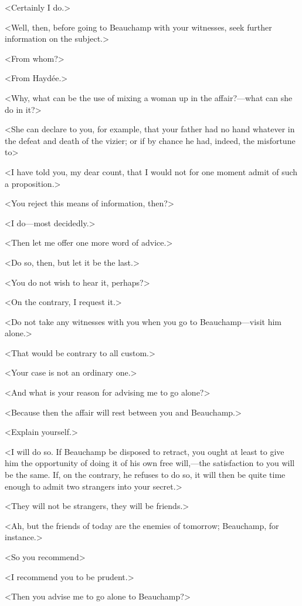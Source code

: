  <Certainly I do.> 

 <Well, then, before going to Beauchamp with your witnesses, seek further information on the subject.> 

 <From whom?> 

 <From Haydée.> 

 <Why, what can be the use of mixing a woman up in the affair?—what can she do in it?> 

 <She can declare to you, for example, that your father had no hand whatever in the defeat and death of the vizier; or if by chance he had, indeed, the misfortune to\longdash> 

 <I have told you, my dear count, that I would not for one moment admit of such a proposition.> 

 <You reject this means of information, then?> 

 <I do—most decidedly.> 

 <Then let me offer one more word of advice.> 

 <Do so, then, but let it be the last.> 

 <You do not wish to hear it, perhaps?> 

 <On the contrary, I request it.> 

 <Do not take any witnesses with you when you go to Beauchamp—visit him alone.> 

 <That would be contrary to all custom.> 

 <Your case is not an ordinary one.> 

 <And what is your reason for advising me to go alone?> 

 <Because then the affair will rest between you and Beauchamp.> 

 <Explain yourself.> 

 <I will do so. If Beauchamp be disposed to retract, you ought at least to give him the opportunity of doing it of his own free will,—the satisfaction to you will be the same. If, on the contrary, he refuses to do so, it will then be quite time enough to admit two strangers into your secret.> 

 <They will not be strangers, they will be friends.> 

 <Ah, but the friends of today are the enemies of tomorrow; Beauchamp, for instance.> 

 <So you recommend\longdash> 

 <I recommend you to be prudent.> 

 <Then you advise me to go alone to Beauchamp?> 

